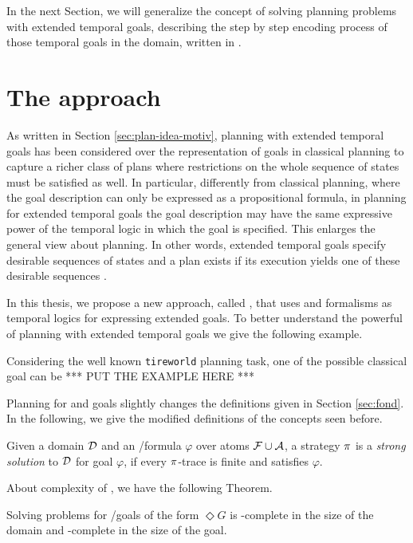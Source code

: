 In the next Section, we will generalize the concept of solving \FOND planning problems with extended temporal goals, describing the step by step encoding process of those temporal goals in the \FOND domain, written in \PDDL.
\section{The \FONDFOR approach}
As written in Section \ref{sec:plan-idea-motiv}, planning with extended temporal goals has been considered over the representation of goals in classical planning to capture a richer class of plans where restrictions on the whole sequence of states must be satisfied as well. In particular, differently from classical planning, where the goal description can only be expressed as a propositional formula, in planning for extended temporal goals the goal description may have the same expressive power of the temporal logic in which the goal is specified. This enlarges the general view about planning. In other words, extended temporal goals specify desirable sequences of states and a plan exists if its execution yields one of these desirable sequences \citep{bacchus1998planning}.

In this thesis, we propose a new approach, called \FONDFOR, that uses \LTLf and \PLTL formalisms as temporal logics for expressing extended goals.
To better understand the powerful of planning with extended temporal goals we give the following example.

\begin{example}\label{ex:pla-temp-simple}
Considering the well known \texttt{tireworld} \FOND planning task, one of the possible classical goal can be
*** PUT THE EXAMPLE HERE ***
\end{example}

Planning for \LTLf and \PLTL goals slightly changes the definitions given in Section \ref{sec:fond}. In the following, we give the modified definitions of the concepts seen before.

\begin{definition}\label{def:strong-sol-extend}
Given a domain $\mathcal{D}$ and an \LTLf/\PLTL formula $\varphi$ over atoms $\mathcal{F} \cup \mathcal{A}$, a strategy $\pi$ is a \textit{strong solution} to $\mathcal{D}$ for goal $\varphi$, if every $\pi$-trace is finite and satisfies $\varphi$.
\end{definition}

About complexity of \FONDS, we have the following Theorem.

\begin{theorem}\citep{rintanen2004complexity}
\label{th:fond-complex}
Solving \FONDS problems for \LTLf/\PLTL goals of the form $\Diamond G$ is \EXPTIME-complete in the size of the domain and \TWOEXPTIME-complete in the size of the goal.
\end{theorem}

